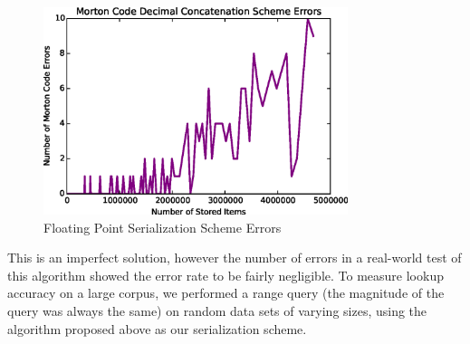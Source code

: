 \documentclass[10pt]{IEEEtran}
\newcommand*\Let[2]{\State #1 $\gets$ #2}
\newcommand*\Append[2]{\State #1$.append($#2$)$}
\begin{document}
\begin{figure}[!t]
\centering
\includegraphics[width=3.5in]{errors.eps}
\caption{Floating Point Serialization Scheme Errors}
\label{fig_ZOrd}
\end{figure}

\par This is an imperfect solution, however the number of errors in a real-world test of this algorithm showed the error rate to be fairly negligible. To measure lookup accuracy on a large corpus, we performed a range query (the magnitude of the query was always the same) on random data sets of varying sizes, using the algorithm proposed above as our serialization scheme.
        
\end{document}
